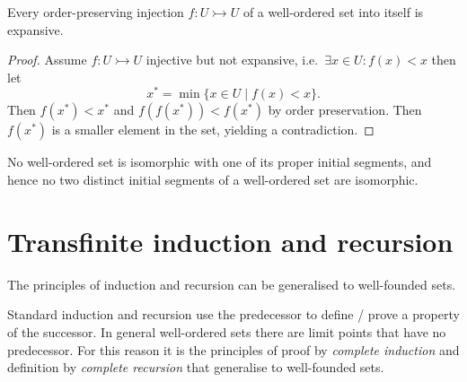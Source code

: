 \begin{proposition} \label{injectionsExpansive}
Every order-preserving injection $f: U\rightarrowtail U$ of a well-ordered set into itself is expansive.
\end{proposition}
\begin{proof}
Assume $f: U\rightarrowtail U$ injective but not expansive, i.e.\ $\exists x\in U: f(x)<x$ then let
\[ x^* = \min\{x\in U\;|\;f(x)<x\}. \]
Then $f(x^*)<x^*$ and $f(f(x^*)) < f(x^*)$ by order preservation. Then $f(x^*)$ is a smaller element in the set, yielding a contradiction.
\end{proof}
\begin{corollary} \label{properInitialSegmentNotIsomorphic}
No well-ordered set is isomorphic with one of its proper initial
segments, and hence no two distinct initial segments of a well-ordered set are
isomorphic.
\end{corollary}

\section{Transfinite induction and recursion}
The principles of induction and recursion can be generalised to well-founded sets.

Standard induction and recursion use the predecessor to define / prove a property of the successor. In general well-ordered sets there are limit points that have no predecessor. For this reason it is the principles of proof by \textit{complete
induction} and definition by \textit{complete recursion} that generalise to well-founded sets.

